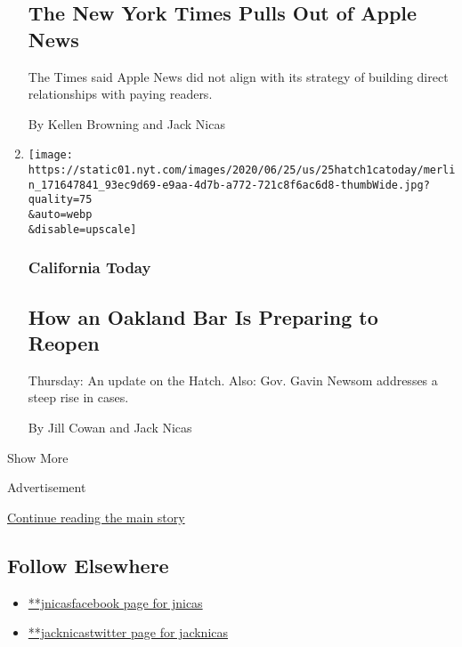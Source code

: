 \begin{enumerate}
  \hypertarget{the-new-york-times-pulls-out-of-apple-news}{%
  \subsection{The New York Times Pulls Out of Apple
  News}\label{the-new-york-times-pulls-out-of-apple-news}}

  The Times said Apple News did not align with its strategy of building
  direct relationships with paying readers.

  By Kellen Browning and Jack Nicas
\item
  \href{/2020/06/25/us/coronavirus-oakland-reopening-bar.html}{}

  \texttt{[image: https://static01.nyt.com/images/2020/06/25/us/25hatch1catoday/merlin\_171647841\_93ec9d69-e9aa-4d7b-a772-721c8f6ac6d8-thumbWide.jpg?quality=75\\\&auto=webp\\\&disable=upscale]}

  \hypertarget{california-today}{%
  \subsubsection{California Today}\label{california-today}}

  \hypertarget{how-an-oakland-bar-is-preparing-to-reopen}{%
  \subsection{How an Oakland Bar Is Preparing to
  Reopen}\label{how-an-oakland-bar-is-preparing-to-reopen}}

  Thursday: An update on the Hatch. Also: Gov. Gavin Newsom addresses a
  steep rise in cases.

  By Jill Cowan and Jack Nicas
\end{enumerate}

Show More

Advertisement

\protect\hyperlink{after-mid2}{Continue reading the main story}

\hypertarget{follow-elsewhere}{%
\subsection{Follow Elsewhere}\label{follow-elsewhere}}

\begin{itemize}
\tightlist
\item
  \href{https://www.facebook.com/jnicas}{**jnicasfacebook page for
  jnicas}
\item
  \href{https://twitter.com/jacknicas}{**jacknicastwitter page for
  jacknicas}
\end{itemize}

